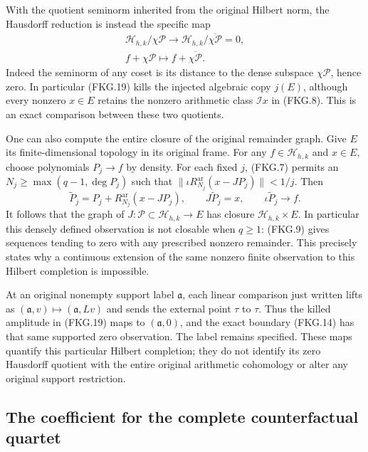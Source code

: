 With the quotient seminorm inherited from the original Hilbert norm,
the Hausdorff reduction is instead the specific map
\[
 \begin{gathered}
 \mathscr H_{h,k}/\chi\mathcal P\longrightarrow
 \mathscr H_{h,k}/\overline{\chi\mathcal P}=0,\\
 f+\chi\mathcal P\longmapsto f+\overline{\chi\mathcal P}.
 \end{gathered}
 \tag{FKG.19}
\]
Indeed the seminorm of any coset is its distance to the dense
subspace $\chi\mathcal P$, hence zero. In particular (FKG.19)
kills the injected algebraic copy $j(E)$, although every nonzero
$x\in E$ retains the nonzero arithmetic class $\mathcal I x$ in
(FKG.8). This is an exact comparison between these two quotients.

One can also compute the entire closure of the original remainder
graph. Give $E$ its finite-dimensional topology in its original frame.
For any $f\in\mathscr H_{h,k}$ and $x\in E$, choose polynomials
$P_j\to f$ by density. For each fixed $j$, (FKG.7) permits an
$N_j\geq\max(q-1,\deg P_j)$ such that
$\|\iota R_{N_j}^{\mathrm{ar}}(x-JP_j)\|<1/j$. Then
\[
 \widetilde P_j=P_j+R_{N_j}^{\mathrm{ar}}(x-JP_j),\qquad
 J\widetilde P_j=x,\qquad\iota\widetilde P_j\longrightarrow f.
 \tag{FKG.20}
\]
It follows that the graph of $J:\mathcal P\subset\mathscr H_{h,k}\to E$
has closure $\mathscr H_{h,k}\times E$. In particular this densely
defined observation is not closable when $q\geq1$: (FKG.9) gives
sequences tending to zero with any prescribed nonzero remainder.
This precisely states why a continuous extension of the same
nonzero finite observation to this Hilbert completion is impossible.

At an original nonempty support label $\mathfrak a$, each linear
comparison just written lifts as
$(\mathfrak a,v)\mapsto(\mathfrak a,Lv)$ and sends the external
point $\tau$ to $\tau$. Thus the killed amplitude in (FKG.19) maps
to $(\mathfrak a,0)$, and the exact boundary (FKG.14) has that
same supported zero observation. The label remains specified.
These maps quantify this particular Hilbert completion; they do
not identify its zero Hausdorff quotient with the entire original
arithmetic cohomology or alter any original support restriction.

\subsection{The coefficient for the complete counterfactual quartet}

